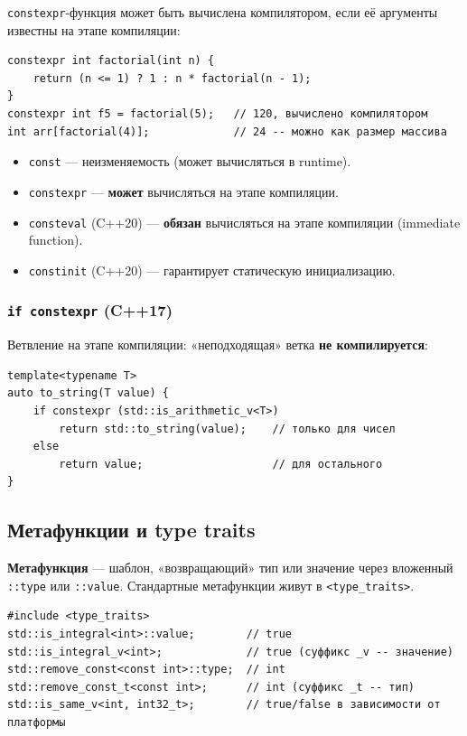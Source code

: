 \texttt{constexpr}-функция может быть вычислена компилятором, если её аргументы
известны на этапе компиляции:

\begin{lstlisting}
constexpr int factorial(int n) {
    return (n <= 1) ? 1 : n * factorial(n - 1);
}
constexpr int f5 = factorial(5);   // 120, вычислено компилятором
int arr[factorial(4)];             // 24 -- можно как размер массива
\end{lstlisting}

\begin{itemize}[leftmargin=2em]
    \item \texttt{const} --- неизменяемость (может вычисляться в runtime).
    \item \texttt{constexpr} --- \textbf{может} вычисляться на этапе компиляции.
    \item \texttt{consteval} (C++20) --- \textbf{обязан} вычисляться на этапе
          компиляции (immediate function).
    \item \texttt{constinit} (C++20) --- гарантирует статическую инициализацию.
\end{itemize}

\subsubsection{\texttt{if constexpr} (C++17)}

Ветвление на этапе компиляции: «неподходящая» ветка \textbf{не компилируется}:

\begin{lstlisting}
template<typename T>
auto to_string(T value) {
    if constexpr (std::is_arithmetic_v<T>)
        return std::to_string(value);    // только для чисел
    else
        return value;                    // для остального
}
\end{lstlisting}

\subsection{Метафункции и type traits}

\textbf{Метафункция} --- шаблон, «возвращающий» тип или значение через вложенный
\texttt{::type} или \texttt{::value}. Стандартные метафункции живут в
\texttt{<type\_traits>}.

\begin{lstlisting}
#include <type_traits>
std::is_integral<int>::value;        // true
std::is_integral_v<int>;             // true (суффикс _v -- значение)
std::remove_const<const int>::type;  // int
std::remove_const_t<const int>;      // int (суффикс _t -- тип)
std::is_same_v<int, int32_t>;        // true/false в зависимости от платформы
\end{lstlisting}

